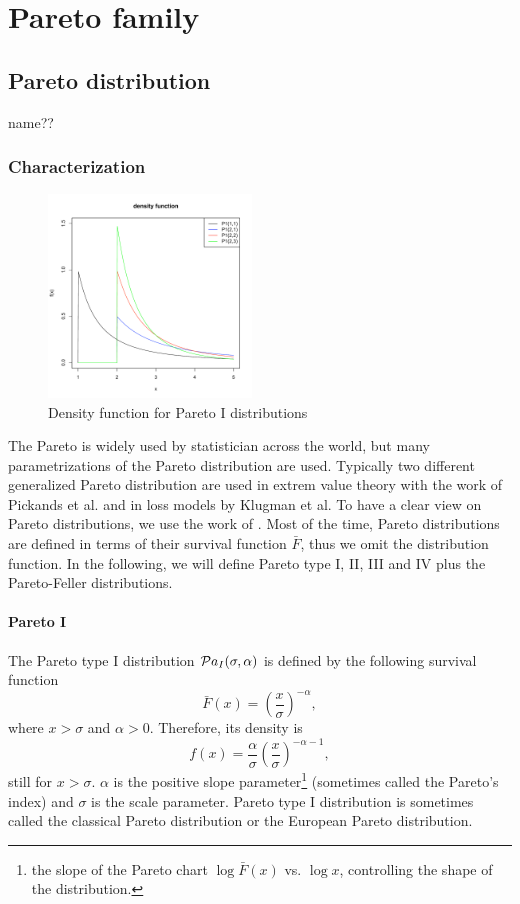 \chapter{Pareto family}
\section{Pareto distribution}
name??
\subsection{Characterization}
\begin{figure}
  \vspace{-20pt}
  \begin{center}
    \includegraphics[width=0.48\textwidth]{img/pareto1zoom}
  \end{center}
  \vspace{-20pt}  
  \caption{Density function for Pareto I distributions}
  \vspace{-20pt}  
\end{figure}
The Pareto is widely used by statistician across the world, but many parametrizations of the Pareto distribution are used. Typically two different generalized Pareto distribution are used in extrem value theory with the work of Pickands et al. and in loss models by Klugman et al. To have a clear view on Pareto distributions, we use the work of \cite{arnold83}.
Most of the time, Pareto distributions are defined in terms of their survival function $\bar F$, thus we omit the distribution function. In the following, we will define Pareto type I, II, III and IV plus the Pareto-Feller distributions. 

\subsubsection{Pareto I}
The Pareto type I distribution $\mathcal Pa_I(\sigma, \alpha)$ is defined by the following survival function
$$
\bar F(x) = \left(\frac{x}{\sigma}\right)^{-\alpha},
$$
where $x>\sigma$ and $\alpha>0$. Therefore, its density is 
$$
f(x) = \frac{\alpha}{\sigma} \left(\frac{x}{\sigma}\right)^{-\alpha-1},
$$
still for $x>\sigma$. $\alpha$ is the positive slope parameter\footnote{the slope of the Pareto chart $\log \bar F(x)$ vs. $\log x$, controlling the shape of the distribution.} (sometimes called the Pareto's index) and $\sigma$ is the scale parameter.
Pareto type I distribution is sometimes called the classical Pareto distribution or the European Pareto distribution.

